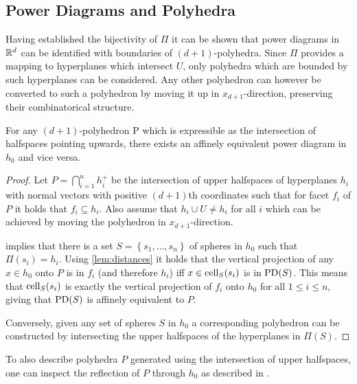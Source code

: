 \subsection{Power Diagrams and Polyhedra}
\label{sub:power_diagrams_and_polyhedra}
Having established the bijectivity of $\Pi$ it can be shown that power diagrams in $\mathbb{R}^d$ can be identified with boundaries of $(d+1)$-polyhedra.
Since $\Pi$ provides a mapping to hyperplanes which intersect $U$, only polyhedra which are bounded by such hyperplanes can be considered.
Any other polyhedron can however be converted to such a polyhedron by moving it up in $x_{d+1}$-direction, preserving their combinatorical structure.
\begin{theorem}
    \label{thm:equivalentpolyhedron}
    For any $(d+1)$-polyhedron P which is expressible as the intersection of halfspaces pointing upwards, there exists an affinely equivalent power diagram in $h_0$ and vice versa.
\end{theorem}
\begin{proof}
    Let $P = \bigcap_{i=1}^n h_i^+$ be the intersection of upper halfspaces of hyperplanes $h_i$ with normal vectors with positive $(d+1)$th coordinates such that for facet $f_i$ of $P$ it holds that $f_i \subseteq h_i$.
    Also assume that $h_i \cup U \neq h_i$ for all $i$ which can be achieved by moving the polyhedron in $x_{d+1}$-direction.

     implies that there is a set $S = \left\{ s_1, \dots, s_n \right\}$ of spheres in $h_0$ such that $\Pi(s_i) = h_i$.
    Using \cref{lem:distances} it holds that the vertical projection of any $x \in h_0$ onto $P$ is in $f_i$ (and therefore $h_i$) iff $x \in \operatorname{cell}_S(s_i)$ is in $\operatorname{PD}(S)$.
    This means that $\operatorname{cell}_S(s_i)$ is exactly the vertical projection of $f_i$ onto $h_0$ for all $1 \leq i \leq n$, giving that $\operatorname{PD}(S)$ is affinely equivalent to $P$.

    Conversely, given any set of spheres $S$ in $h_0$ a corresponding polyhedron can be constructed by intersecting the upper halfspaces of the hyperplanes in $\Pi(S)$.
\end{proof}
To also describe polyhedra $P$ generated using the intersection of upper halfspaces, one can inspect the reflection of $P$ through $h_0$ as described in \cite{aurenhammer1987power}.

